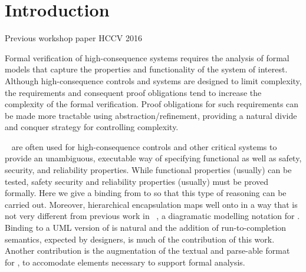 
\section{Introduction}
\label{sec:introduction}

Previous workshop paper HCCV 2016~\cite{Morris_2016}

Formal verification of high-consequence systems requires the analysis
of formal models that capture the properties and functionality of the
system of interest. Although high-consequence controls and systems are
designed to limit complexity, the requirements and consequent proof
obligations tend to increase the complexity of the formal verification.  
Proof obligations for such requirements can be made more tractable using
abstraction/refinement, providing a natural divide and conquer
strategy for controlling complexity.

\Statecharts~\cite{Harel} are often used for high-consequence controls
and other critical systems to provide an unambiguous, executable way
of specifying functional as well as safety, security, and reliability
properties.  While functional properties (usually) can be tested,
safety security and reliability properties (usually) must be proved
formally.  Here we give a binding from \Statecharts to \EventB so that
this type of reasoning can be carried out.  Moreover, hierarchical
encapsulation maps well onto \Statecharts in a way that is not very
different from previous work in \iUMLB~\cite{Snook2006,snook14:_b_statem,Snook12:FMCO}, a diagramatic modelling notation for \EventB.
Binding \iUMLB to a UML version of \Statecharts is natural and the
addition of run-to-completion semantics, expected by \Statechart
designers, is much of the contribution of this work.  Another
contribution is the augmentation of the textual and parse-able format
for \Statecharts, \SCXML to accomodate elements necessary to support formal
analysis. 

